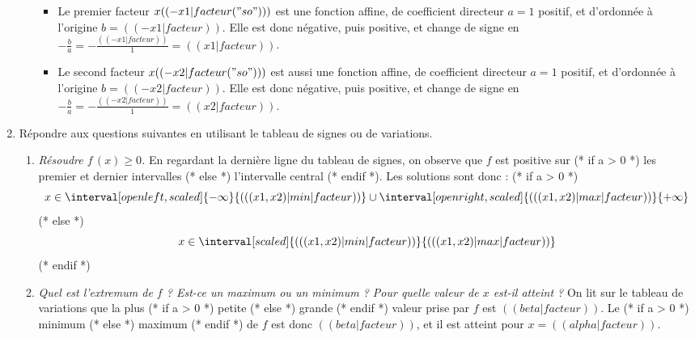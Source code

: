 \begin{enumerate}
\begin{enumerate}
\begin{itemize}
\item Le premier facteur $x (( -x1|facteur("so") ))$ est une fonction affine, de coefficient directeur $a=1$ positif, et d'ordonnée à l'origine $b=(( -x1|facteur ))$. Elle est donc négative, puis positive, et change de signe en $-\frac{b}{a}=-\frac{(( -x1|facteur ))}{1}=(( x1|facteur ))$.
\item Le second facteur $x (( -x2|facteur("so") ))$ est aussi une fonction affine, de coefficient directeur $a=1$ positif, et d'ordonnée à l'origine $b=(( -x2|facteur ))$. Elle est donc négative, puis positive, et change de signe en $-\frac{b}{a}=-\frac{(( -x2|facteur ))}{1}=(( x2|facteur ))$.
\end{itemize}
\begin{center}
\end{center}
\end{enumerate}
\item Répondre aux questions suivantes en utilisant le tableau de signes ou de variations.
\begin{enumerate}
\item \emph{Résoudre $f\,(x)\geqslant0$.} En regardant la dernière ligne du tableau de signes, on observe que $f$ est positive sur
(* if a > 0 *) les premier et dernier intervalles (* else *) l'intervalle central (* endif *).
Les solutions sont donc :
(* if a > 0 *)
   \[ x\in\interval[open left, scaled]{-\infty}{(( (x1, x2)|min|facteur ))} \cup \interval[open right, scaled]{(( (x1, x2)|max|facteur ))}{+\infty} \]
(* else *)
   \[ x\in\interval[scaled]{(( (x1, x2)|min|facteur ))}{(( (x1, x2)|max|facteur ))} \]
(* endif *)
\item \emph{Quel est l'extremum de $f$ ? Est-ce un maximum ou un minimum ? Pour quelle valeur de $x$ est-il atteint ?} On lit sur le tableau de variations que la plus
(* if a > 0 *) petite (* else *) grande (* endif *)
valeur prise par $f$ est $(( beta|facteur ))$. Le
(* if a > 0 *) minimum (* else *) maximum (* endif *)
de $f$ est donc $(( beta|facteur ))$, et il est atteint pour $x=(( alpha|facteur ))$.
\end{enumerate}
\end{enumerate}
